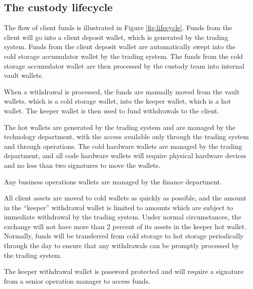 \subsection{The custody lifecycle}
The flow of client funds is illustrated in Figure \ref{fig:lifecycle}.  Funds from the
client will go into a client deposit wallet, which is generated by the
trading system.  Funds from the client deposit wallet are
automatically swept into the cold storage accumulator wallet by the trading
system.  The funds from the cold storage accumulator wallet are then
processed by the custody team into internal vault wallets.

When a withdrawal is processed, the funds are manually moved from the
vault wallets, which is a cold storage wallet, into the keeper wallet, which is a hot wallet.  The keeper wallet
is then used to fund withdrawals to the client.

The hot wallets are generated by the trading system and are managed by
the technology department, with the access available only through the
trading system and through operations.  The cold hardware wallets are
managed by the trading department, and all code hardware wallets will
require physical hardware devices and no less than two signatures to
move the wallets.

Any business operations wallets are managed by the finance
department.

All client assets are moved to cold wallets as quickly as possible,
and the amount in the ``keeper'' withdrawal wallet is limited to
amounts which are subject to immediate withdrawal by the trading
system.  Under normal circumstances, the exchange will not have more
than 2 percent of its assets in the keeper hot wallet.  Normally,
funds will be transferred from cold storage to hot storage periodically
through the day to ensure that any withdrawals can be
promptly processed by the trading system.

The keeper withdrawal wallet is password protected and will require a
signature from a senior operation manager to access funds.


